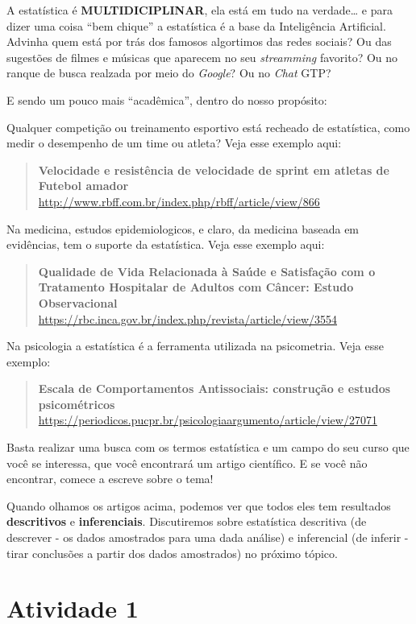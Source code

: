 \documentclass[
]{book}
\begin{document}
A estatística é \textbf{MULTIDICIPLINAR}, ela está em tudo na verdade\ldots{} e para dizer uma coisa ``bem chique'' a estatística é a base da Inteligência Artificial. Advinha quem está por trás dos famosos algortimos das redes sociais? Ou das sugestões de filmes e músicas que aparecem no seu \emph{streamming} favorito? Ou no ranque de busca realzada por meio do \emph{Google}? Ou no \emph{Chat} GTP?

E sendo um pouco mais ``acadêmica'', dentro do nosso propósito:

Qualquer competição ou treinamento esportivo está recheado de estatística, como medir o desempenho de um time ou atleta? Veja esse exemplo aqui:

\begin{quote}
\textbf{Velocidade e resistência de velocidade de sprint em atletas de Futebol amador} \url{http://www.rbff.com.br/index.php/rbff/article/view/866}
\end{quote}

Na medicina, estudos epidemiologicos, e claro, da medicina baseada em evidências, tem o suporte da estatística. Veja esse exemplo aqui:

\begin{quote}
\textbf{Qualidade de Vida Relacionada à Saúde e Satisfação com o Tratamento Hospitalar de Adultos com Câncer: Estudo Observacional}
\url{https://rbc.inca.gov.br/index.php/revista/article/view/3554}
\end{quote}

Na psicologia a estatística é a ferramenta utilizada na psicometria. Veja esse exemplo:

\begin{quote}
\textbf{Escala de Comportamentos Antissociais: construção e estudos psicométricos} \url{https://periodicos.pucpr.br/psicologiaargumento/article/view/27071}
\end{quote}

Basta realizar uma busca com os termos estatística e um campo do seu curso que você se interessa, que você encontrará um artigo científico. E se você não encontrar, comece a escreve sobre o tema!

Quando olhamos os artigos acima, podemos ver que todos eles tem resultados \textbf{descritivos} e \textbf{inferenciais}. Discutiremos sobre estatística descritiva (de descrever - os dados amostrados para uma dada análise) e inferencial (de inferir - tirar conclusões a partir dos dados amostrados) no próximo tópico.

\section{Atividade 1}\label{atividade-1}
\end{document}
